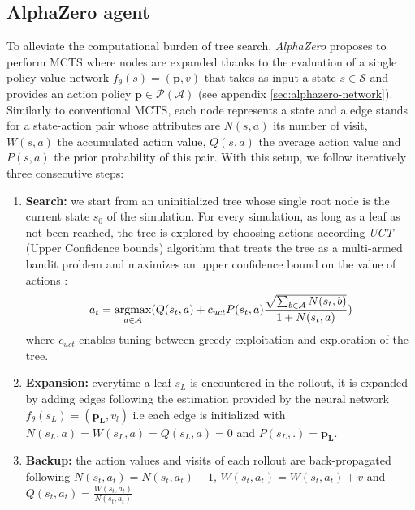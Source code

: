 \documentclass[journal, a4paper]{IEEEtran}
\newcommand{\argmax}{\operatornamewithlimits{argmax}}
\begin{document}
\subsection{AlphaZero agent}
\label{ssec:alphazero}
    To alleviate the computational burden of tree search, \textit{AlphaZero}\cite{alphazero} proposes to perform MCTS where nodes are expanded thanks to the evaluation of a single policy-value network $f_\theta(s)=(\mathbf{p}, v)$ that takes as input a state $s\in \mathcal{S}$ and provides an action policy $\mathbf{p}\in\mathcal{P}(\mathcal{A})$ (see appendix \ref{sec:alphazero-network}). Similarly to conventional MCTS, each node represents a state and a edge stands for a state-action pair whose attributes are $N(s,a)$ its number of visit, $W(s,a)$ the accumulated action value, $Q(s,a)$ the average action value and $P(s,a)$ the prior probability of this pair. With this setup, we follow iteratively three consecutive steps:
    \begin{enumerate}
        \item \textbf{Search:} we start from an uninitialized tree whose single root node is the current state $s_0$ of the simulation. For every simulation, as long as a leaf as not been reached, the tree is explored by choosing actions according \textit{UCT} (Upper Confidence bounds) algorithm that treats the tree as a multi-armed bandit problem and maximizes an upper confidence bound on the value of actions : $$a_t=\argmax_{a\in\mathcal{A}}(Q(s_t, a)+c_{uct}P(s_t,a)\frac{\sqrt{\sum_{b\in\mathcal{A}}N(s_t, b)}}{1+N(s_t,a)})$$ where $c_{uct}$ enables tuning between greedy exploitation and exploration of the tree.
        \item \textbf{Expansion:} everytime a leaf $s_L$ is encountered in the rollout, it is expanded by adding edges following the estimation provided by the neural network $f_\theta(s_L)=(\mathbf{p_L}, v_l)$ i.e each edge is initialized with $N(s_L, a)=W(s_L,a)=Q(s_L,a)=0$ and $P(s_L,.)=\mathbf{p_L}$.
        \item \textbf{Backup:} the action values and visits of each rollout are back-propagated following $N(s_t, a_t) = N(s_t, a_t) + 1$, $W(s_t, a_t) = W(s_t, a_t) + v$ and $Q(s_t, a_t)=\frac{W(s_t, a_t)}{N(s_t, a_t)}$
    \end{enumerate}
\end{document}
